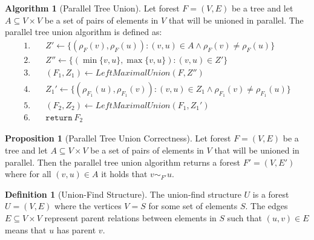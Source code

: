 \documentclass[a4paper,12pt]{article}
\theoremstyle{definition}
\newtheorem{definition}{Definition}[section]
\newtheorem{proposition}{Proposition}[section]
\newtheorem{algorithm}{Algorithm}[section]
\newcommand{\id}[1]{\ensuremath{\mathit{#1}}}
\newcommand{\kw}[1]{\ensuremath{\mathtt{#1}}}
\begin{document}
\begin{algorithm}[Parallel Tree Union]
    Let forest $F = (V, E)$ be a tree and let $A \subseteq V \times V$ be a set of pairs
    of elements in $V$ that will be unioned in parallel. The parallel tree union
    algorithm is defined as:
    \begin{align*}
        1. & \quad Z' \leftarrow \{(\rho_F(v), \rho_F(u)) : (v, u) \in A \land \rho_F(v) \neq \rho_F(u)\} \\
        2. & \quad Z'' \leftarrow \{(\min \{v, u\}, \max \{v, u\}) : (v, u) \in Z'\} \\
        3. & \quad (F_1, Z_1) \leftarrow \id{LeftMaximalUnion}(F, Z'') \\
        4. & \quad Z_1' \leftarrow \{(\rho_{F_1}(u), \rho_{F_1}(v)) : (v, u) \in Z_1 \land \rho_{F_1}(v) \neq \rho_{F_1}(u)\} \\
        5. & \quad (F_2, Z_2) \leftarrow \id{LeftMaximalUnion}(F_1, Z_1') \\
        6. & \quad \kw{return} \: F_2
    \end{align*}
\end{algorithm}
\begin{proposition}[Parallel Tree Union Correctness]
    Let forest $F = (V, E)$ be a tree and let $A \subseteq V \times V$ be a set of pairs
    of elements in $V$ that will be unioned in parallel. Then the parallel tree union
    algorithm returns a forest $F' = (V, E')$ where for all $(v, u) \in A$ it holds that
    $v \sim_{F'} u$.
\end{proposition}

\begin{definition}[Union-Find Structure]
    The union-find structure $U$ is a forest $U = (V, E)$ where the vertices $V
    = S$ for some set of elements $S$. The edges $E \subseteq V \times V$
    represent parent relations between elements in $S$ such that $(u, v) \in E$
    means that $u$ has parent $v$.
\end{definition}
\end{document}
